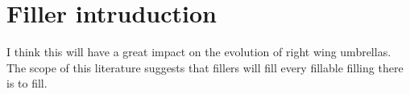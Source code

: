 \section{Filler intruduction}

I think this will have a great impact on the evolution of right wing umbrellas. The scope of this literature suggests
that fillers will fill every fillable filling there is to fill.